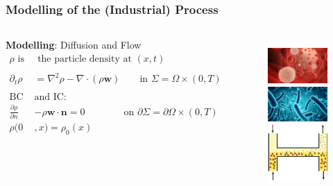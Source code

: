 \documentclass[aspectratio=169,xcolor=dvipsnames]{beamer}
\begin{document}
\begin{frame}
	\frametitle{Modelling of the (Industrial) Process}
	\begin{columns}
		\textbf{Modelling}: Diffusion and Flow
		\begin{align*}
		\rho \text{ is}& \text{ the particle density at } (x,t)\\
		\\
        \partial_t \rho &= \nabla^2 \rho - \nabla \cdot (\rho \mathbf{w}) \qquad \text{in    } \Sigma = \Omega \times (0,T)\\
        \\
        \text{BC }& \text{and IC:}\\
        \frac{\partial \rho}{\partial n}& - \rho \mathbf{w} \cdot \mathbf{n} = 0 \qquad \qquad \text{on   } \partial \Sigma = \partial \Omega \times (0,T)   \\
        \rho(0&,x) = \rho_0(x) 
		\end{align*}
		\begin{figure}
			\includegraphics[width=3cm]{bloodcells.jpg}\\
			\includegraphics[width=3cm]{bacteria.png}\\
			\includegraphics[width=3cm]{Microfilter.png}
		\end{figure}
	\end{columns}
\end{frame}
\end{document}
